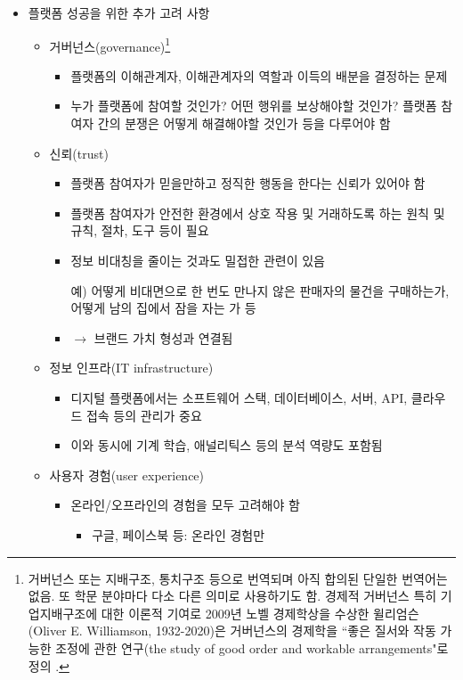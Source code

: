 \begin{itemize}
\item 플랫폼 성공을 위한 추가 고려 사항
	\begin{itemize}
	\item 거버넌스(governance)\footnote{거버넌스 또는 지배구조, 통치구조 등으로 번역되며 아직 합의된 단일한 번역어는 없음. 또 학문 분야마다 다소 다른 의미로 사용하기도 함. 경제적 거버넌스 특히 기업지배구조에 대한 이론적 기여로 2009년 노벨 경제학상을 수상한 윌리엄슨(Oliver E. Williamson, 1932-2020)은 거버넌스의 경제학을 ``좋은 질서와 작동 가능한 조정에 관한 연구(the study of good order and workable arrangements"로 정의 \citep{Williamson:2005ws}.}
		\begin{itemize}
		\item 플랫폼의 이해관계자, 이해관계자의 역할과 이득의 배분을 결정하는 문제
		\item 누가 플랫폼에 참여할 것인가? 어떤 행위를 보상해야할 것인가? 플랫폼 참여자 간의 분쟁은 어떻게 해결해야할 것인가 등을 다루어야 함
		\end{itemize}
	\item 신뢰(trust)
		\begin{itemize}
		\item 플랫폼 참여자가 믿을만하고 정직한 행동을 한다는 신뢰가 있어야 함
		\item 플랫폼 참여자가 안전한 환경에서 상호 작용 및 거래하도록 하는 원칙 및 규칙, 절차, 도구 등이 필요
		\item 정보 비대칭을 줄이는 것과도 밀접한 관련이 있음
		\item[예)] 어떻게 비대면으로 한 번도 만나지 않은 판매자의 물건을 구매하는가, 어떻게 남의 집에서 잠을 자는 가 등
		\item $\rightarrow$ 브랜드 가치 형성과 연결됨 
		\end{itemize}
	\item 정보 인프라(IT infrastructure)
		\begin{itemize}
		\item 디지털 플랫폼에서는 소프트웨어 스택, 데이터베이스, 서버, API, 클라우드 접속 등의 관리가 중요
		\item 이와 동시에 기계 학습, 애널리틱스 등의 분석 역량도 포함됨
		\end{itemize}
	\item 사용자 경험(user experience)
		\begin{itemize}
		\item 온라인/오프라인의 경험을 모두 고려해야 함
			\begin{itemize}
			\item 구글, 페이스북 등: 온라인 경험만

\end{itemize}
\end{itemize}
\end{itemize}
\end{itemize}
